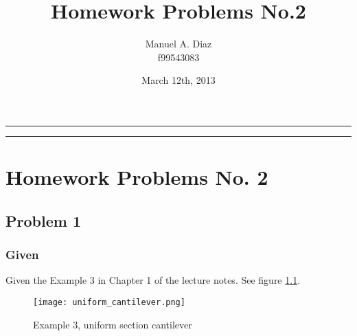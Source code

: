 \documentclass[a4paper]{memoir}
\title{\huge \textbf{Homework Problems No.2}}
\author{Manuel A. Diaz \\ f99543083}
\date{March 12th, 2013} %
\begin{document}
\thispagestyle{empty}
\begin{center}{
\begin{shaded}
\hrule \vspace{30pt}
\hspace{30pt} \thetitle  \vspace{30pt}
\newline \theauthor \hspace{30pt} \thedate  \vspace{26pt}
\hrule
\end{shaded}
}
\end{center}
\clearpage


\pagestyle{Ruled}                    %
\midsloppy                             %


\checkandfixthelayout          %

\chapter{Homework Problems No. 2}
\section{Problem 1}
\subsection{Given}
Given the Example 3 in Chapter 1 of the lecture notes. See figure \ref{fig:uniform_cantilever}.

\begin{figure}
	\centering
		\texttt{[image: uniform\_cantilever.png]}
	\caption{Example 3, uniform section cantilever}
	\label{fig:uniform_cantilever}
\end{figure}
\end{document}
